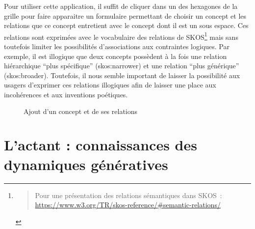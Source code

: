 \documentclass[
  a4paper,
  DIV=11,
  numbers=noendperiod]{scrreprt}
\begin{document}
Pour utiliser cette application, il suffit de cliquer dans un des
hexagones de la grille pour faire apparaitre un formulaire permettant de
choisir un concept et les relations que ce concept entretient avec le
concept dont il est un sous espace. Ces relations sont exprimées avec le
vocabulaire des relations de SKOS\footnote{\begin{quote}
  Pour une présentation des relations sémantiques dans SKOS~:
  \url{https://www.w3.org/TR/skos-reference/\#semantic-relations/}
  \end{quote}} mais sans toutefois limiter les possibilités
d'associations aux contraintes logiques. Par exemple, il est illogique
que deux concepts possèdent à la fois une relation hiérarchique ``plus
spécifique'' (skos:narrower) et une relation ``plus générique''
(skos:broader). Toutefois, il nous semble important de laisser la
possibilité aux usagers d'exprimer ces relations illogiques afin de
laisser une place aux incohérences et aux inventions poétiques.

\begin{figure}


\caption{\label{fig-cartoHexaAjoutConcept}Ajout d'un concept et de ses
relations}

\end{figure}%

\section{L'actant : connaissances des dynamiques
génératives}\label{sec-espaceActant}
\end{document}
